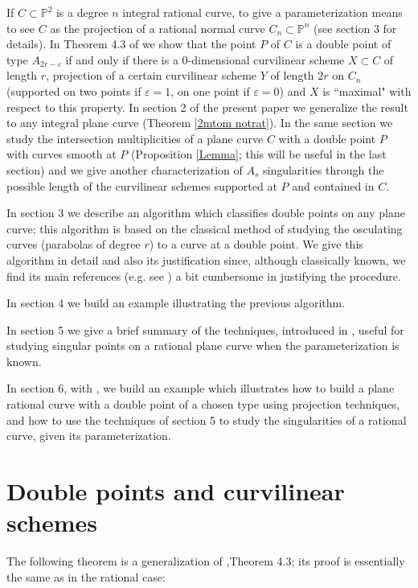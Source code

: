\documentclass[draft]{amsart}
\theoremstyle{definition}
\theoremstyle{remark}
\theoremstyle{definition}
\newcommand{\PP}{\mathbb{P}}
\def\a{\bigskip \par \noindent}
\def\e{\varepsilon}
\begin{document}
\medskip If $C \subset \PP^2$ is a degree $n$ integral rational curve, to give a parameterization means to see $C$ as the projection of a rational normal curve $C_n\subset \PP^n$ (see section 3 for details). In Theorem 4.3 of \cite{BGI} we show that the point $P$ of $C$ is a double point of type $A_{2r-\e}$ if and only if there is a 0-dimensional curvilinear scheme $X\subset C$ of length $r$, projection of a certain curvilinear scheme $Y$ of length $2r$ on $C_n$ (supported on two points if $\e =1$, on one point if $\e=0$) and $X$ is ``maximal" with respect to this property.
 In section 2 of the present paper we generalize the result to any integral plane curve (Theorem \ref{2mtom notrat}). In the same section we study the intersection multiplicities of a plane curve $C$ with a double point $P$ with curves smooth at $P$ (Proposition \ref{Lemma}; this will be useful in the last section) and we give another characterization of $A_s$ singularities through the possible length of the curvilinear schemes supported at $P$ and contained in $C$.

\medskip In section 3 we describe an algorithm which classifies double points on any plane curve; this algorithm is based on the classical method of studying the osculating curves (parabolas of degree $r$) to a curve at a double point. We give this algorithm in detail and also its justification since, although classically known, we find its main references (e.g. see \cite{C}) a bit cumbersome in justifying the procedure.

\medskip In section 4 we build an example illustrating the previous algorithm.

\medskip In section 5 we give a brief summary of the techniques, introduced in \cite {BGI}, useful for studying singular points on a rational plane curve when the parameterization is known.

\medskip In section 6, with \cite{CoCoA}, we build an example which illustrates how to build a plane rational curve with a double point of a chosen type using projection techniques, and how to use the techniques of section 5 to study the singularities of a rational curve, given its parameterization.

\a
\section{Double points and curvilinear schemes}
The following theorem is a generalization of \cite{BGI},Theorem 4.3; its proof is essentially the same as in the rational case:
\end{document}
